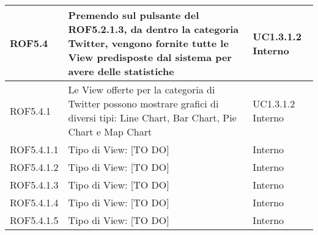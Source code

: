 \begin{center}
\begin{longtable}{| p{2cm} | p{8cm} | p{2cm} |}
		ROF5.4  &  Premendo sul pulsante del ROF5.2.1.3, da dentro la categoria Twitter, vengono fornite tutte le View predisposte dal sistema per avere delle statistiche &  UC1.3.1.2 \newline Interno \\
		\hline
		ROF5.4.1  & Le View offerte per la categoria di Twitter possono mostrare grafici di diversi tipi: Line Chart, Bar Chart, Pie Chart e Map Chart  &  UC1.3.1.2 \newline Interno \\
		\hline
		ROF5.4.1.1  &  Tipo di View: [TO DO] & Interno \\
		\hline	
		ROF5.4.1.2  &  Tipo di View: [TO DO] & Interno \\
		\hline
		ROF5.4.1.3  &  Tipo di View: [TO DO] & Interno \\
		\hline
		ROF5.4.1.4  &  Tipo di View: [TO DO] & Interno \\
		\hline
		ROF5.4.1.5  &  Tipo di View: [TO DO] & Interno \\
		\hline



\end{longtable}
\end{center}
